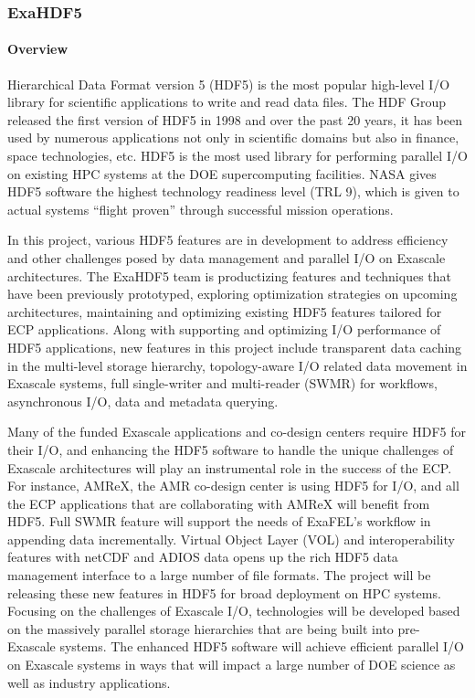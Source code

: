 \subsubsection{ ExaHDF5}\label{subsubsect:exahdf5}

\paragraph{Overview} 

Hierarchical Data Format version 5 (HDF5) is the most popular high-level I/O library for scientific applications to write and read data files. The HDF Group released the first version of HDF5 in 1998 and over the past 20 years, it has been used by numerous applications not only in scientific domains but also in finance, space technologies, etc. HDF5 is the most used library for performing parallel I/O on existing HPC systems at the DOE supercomputing facilities. NASA gives HDF5 software the highest technology readiness level (TRL 9), which is given to actual systems “flight proven” through successful mission operations.

In this project, various HDF5 features are in development to address efficiency and other challenges posed by data management and parallel I/O on Exascale architectures. The ExaHDF5 team is productizing features and techniques that have been previously prototyped, exploring optimization strategies on upcoming architectures, maintaining and optimizing existing HDF5 features tailored for ECP applications. Along with supporting and optimizing I/O performance of HDF5 applications, new features in this project include transparent data caching in the multi-level storage hierarchy, topology-aware I/O related data movement in Exascale systems, full single-writer and multi-reader (SWMR) for workflows, asynchronous I/O, data and metadata querying. 

Many of the funded Exascale applications and co-design centers require HDF5 for their I/O, and enhancing the HDF5 software to handle the unique challenges of Exascale architectures will play an instrumental role in the success of the ECP. For instance, AMReX, the AMR co-design center is using HDF5 for I/O, and all the ECP applications that are collaborating with AMReX will benefit from HDF5. Full SWMR feature will support the needs of ExaFEL's workflow in appending data incrementally. Virtual Object Layer (VOL) and interoperability features with netCDF and ADIOS data opens up the rich HDF5 data management interface to a large number of file formats. The project will be releasing these new features in HDF5 for broad deployment on HPC systems. Focusing on the challenges of Exascale I/O, technologies will be developed based on the massively parallel storage hierarchies that are being built into pre-Exascale systems. The enhanced HDF5 software will achieve efficient parallel I/O on Exascale systems in ways that will impact a large number of DOE science as well as industry applications.

